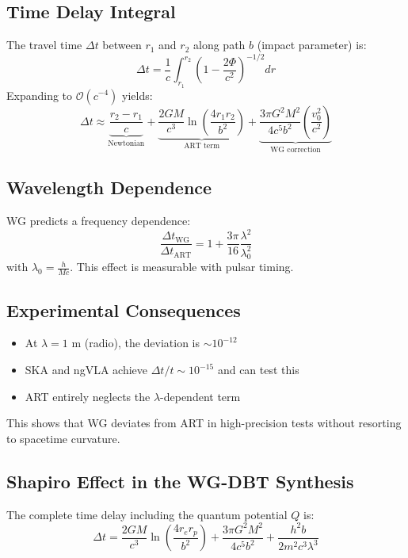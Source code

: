 \subsection{Time Delay Integral}
The travel time $\Delta t$ between $r_1$ and $r_2$ along path $b$ (impact parameter) is:
\begin{equation}
\Delta t = \frac{1}{c}\int_{r_1}^{r_2} \left(1 - \frac{2\Phi}{c^2}\right)^{-1/2} dr
\end{equation}
Expanding to $\mathcal{O}(c^{-4})$ yields:
\begin{equation}
\Delta t \approx \underbrace{\frac{r_2 - r_1}{c}}_{\text{Newtonian}} + \underbrace{\frac{2GM}{c^3}\ln\left(\frac{4r_1r_2}{b^2}\right)}_{\text{ART term}} + \underbrace{\frac{3\pi G^2M^2}{4c^5b^2}\left(\frac{v_0^2}{c^2}\right)}_{\text{WG correction}}
\end{equation}

\subsection{Wavelength Dependence}
WG predicts a frequency dependence:
\begin{equation}
\frac{\Delta t_{\text{WG}}}{\Delta t_{\text{ART}}} = 1 + \frac{3\pi}{16}\frac{\lambda^2}{\lambda_0^2}
\end{equation}
with $\lambda_0 = \frac{h}{Mc}$. This effect is measurable with pulsar timing.

\subsection{Experimental Consequences}
\begin{itemize}
\item At $\lambda = 1$ m (radio), the deviation is $\sim 10^{-12}$
\item SKA and ngVLA achieve $\Delta t/t \sim 10^{-15}$ and can test this
\item ART entirely neglects the $\lambda$-dependent term
\end{itemize}

This shows that WG deviates from ART in high-precision tests without resorting to spacetime curvature.

\subsection{Shapiro Effect in the WG-DBT Synthesis}  
\label{sec:shapiro_dbt}  

The complete time delay including the quantum potential $Q$ is:  
\begin{equation}
    \label{eq:shapiro}
    \boxed
    {
        \Delta t = \frac{2GM}{c^3} \ln\left(\frac{4r_e r_p}{b^2}\right) + \frac{3\pi G^2 M^2}{4c^5 b^2} + \frac{h^2 b}{2m^2 c^3 \lambda^3}  
    }
\end{equation}
